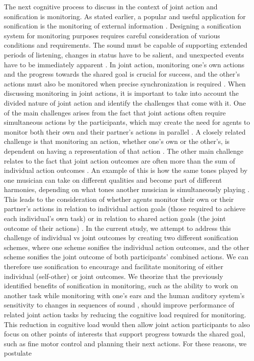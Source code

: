 \documentclass[10pt,a4paper,onecolumn]{article}
\begin{document}
The next cognitive process to discuss in the context of joint action and sonification is monitoring. As stated earlier, a popular and useful application for sonification is the monitoring of external information \autocite{dubusSystematicReviewMapping2013}. Designing a sonification system for monitoring purposes requires careful consideration of various conditions and requirements. The sound must be capable of supporting extended periods of listening, changes in status have to be salient, and unexpected events have to be immediately apparent \autocite{kimotoDesignImplementationStetho2002}. In joint action, monitoring one's own actions and the progress towards the shared goal is crucial for success, and the other's actions must also be monitored when precise synchronization is required \autocite{vesperMinimalArchitectureJoint2010}. When discussing monitoring in joint actions, it is important to take into account the divided nature of joint action and identify the challenges that come with it. One of the main challenges arises from the fact that joint actions often require simultaneous actions by the participants, which may create the need for agents to monitor both their own and their partner's actions in parallel \autocite{loehrMonitoringIndividualJoint2013}. A closely related challenge is that monitoring an action, whether one's own or the other's, is dependent on having a representation of that action \autocite{knoblichPsychologicalResearchJoint2011}. The other main challenge relates to the fact that joint action outcomes are often more than the sum of individual action outcomes \autocite{loehrMonitoringIndividualJoint2013}. An example of this is how the same tones played by one musician can take on different qualities and become part of different harmonies, depending on what tones another musician is simultaneously playing \autocite{loehrMonitoringIndividualJoint2013}. This leads to the consideration of whether agents monitor their own or their partner's actions in relation to individual action goals (those required to achieve each individual's own task) or in relation to shared action goals (the joint outcome of their actions) \autocite{loehrMonitoringIndividualJoint2013}. In the current study, we attempt to address this challenge of individual vs joint outcomes by creating two different sonification schemes, where one scheme sonifies the individual action outcomes, and the other scheme sonifies the joint outcome of both participants' combined actions. We can therefore use sonification to encourage and facilitate monitoring of either individual (self-other) or joint outcomes. We theorize that the previously identified benefits of sonification in monitoring, such as the ability to work on another task while monitoring with one's ears \autocite{vickersSonificationProcessMonitoring2011} and the human auditory system's sensitivity to changes in sequences of sound \autocite{hildebrandtShortPaperEnhancing2014}, should improve performance of related joint action tasks by reducing the cognitive load required for monitoring. This reduction in cognitive load would then allow joint action participants to also focus on other points of interests that support progress towards the shared goal, such as fine motor control and planning their next actions. For these reasons, we postulate 
\end{document}
